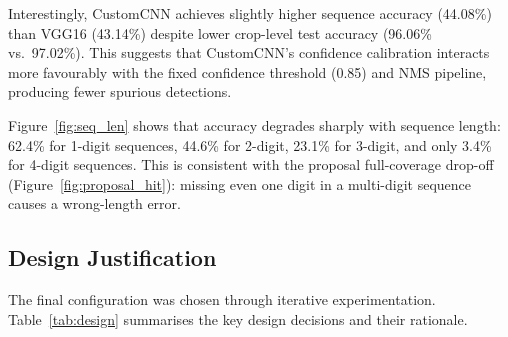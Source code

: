\documentclass[10pt,twocolumn]{article}
\begin{document}
Interestingly, CustomCNN achieves slightly higher sequence accuracy
(44.08\%) than VGG16 (43.14\%) despite lower crop-level test accuracy
(96.06\% vs.\ 97.02\%).
This suggests that CustomCNN's confidence calibration interacts more
favourably with the fixed confidence threshold (0.85) and NMS pipeline,
producing fewer spurious detections.

Figure~\ref{fig:seq_len} shows that accuracy degrades sharply with
sequence length: 62.4\% for 1-digit sequences, 44.6\% for 2-digit, 23.1\%
for 3-digit, and only 3.4\% for 4-digit sequences.
This is consistent with the proposal full-coverage drop-off
(Figure~\ref{fig:proposal_hit}): missing even one digit in a multi-digit
sequence causes a wrong-length error.

\subsection{Design Justification}

The final configuration was chosen through iterative experimentation.
Table~\ref{tab:design} summarises the key design decisions and their
rationale.
\end{document}

